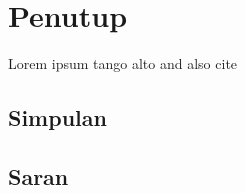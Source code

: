 \chapter{Penutup}

Lorem ipsum \cite{knuth1984} tango alto \cite{lamport1994} and also cite \cite{mckusick1999}

\section{Simpulan}
\section{Saran}